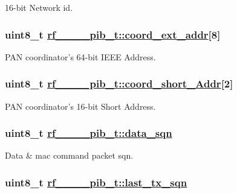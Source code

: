 16-bit Network id. \hypertarget{structrf__802__15__4__pib__t_7b60ab2c7b0a52c40f5dd366d9cae943}{
\subsubsection[coord\_\-ext\_\-addr]{\setlength{\rightskip}{0pt plus 5cm}uint8\_\-t \hyperlink{structrf__802__15__4__pib__t_7b60ab2c7b0a52c40f5dd366d9cae943}{rf\_\_\_\_\-pib\_\-t::coord\_\-ext\_\-addr}\mbox{[}8\mbox{]}}}
\label{structrf__802__15__4__pib__t_7b60ab2c7b0a52c40f5dd366d9cae943}


PAN coordinator's 64-bit IEEE Address. \hypertarget{structrf__802__15__4__pib__t_0bf213a8ed84006ff69a764f07d09b85}{
\subsubsection[coord\_\-short\_\-Addr]{\setlength{\rightskip}{0pt plus 5cm}uint8\_\-t \hyperlink{structrf__802__15__4__pib__t_0bf213a8ed84006ff69a764f07d09b85}{rf\_\_\_\_\-pib\_\-t::coord\_\-short\_\-Addr}\mbox{[}2\mbox{]}}}
\label{structrf__802__15__4__pib__t_0bf213a8ed84006ff69a764f07d09b85}


PAN coordinator's 16-bit Short Address. \hypertarget{structrf__802__15__4__pib__t_48f4794258b60399b861fb91fe95dbb0}{
\subsubsection[data\_\-sqn]{\setlength{\rightskip}{0pt plus 5cm}uint8\_\-t \hyperlink{structrf__802__15__4__pib__t_48f4794258b60399b861fb91fe95dbb0}{rf\_\_\_\_\-pib\_\-t::data\_\-sqn}}}
\label{structrf__802__15__4__pib__t_48f4794258b60399b861fb91fe95dbb0}


Data \& mac command packet sqn. \hypertarget{structrf__802__15__4__pib__t_733aa4f7ba363cb83eb06e9c95d3fcc4}{
\subsubsection[last\_\-tx\_\-sqn]{\setlength{\rightskip}{0pt plus 5cm}uint8\_\-t \hyperlink{structrf__802__15__4__pib__t_733aa4f7ba363cb83eb06e9c95d3fcc4}{rf\_\_\_\_\-pib\_\-t::last\_\-tx\_\-sqn}}}
\label{structrf__802__15__4__pib__t_733aa4f7ba363cb83eb06e9c95d3fcc4}


